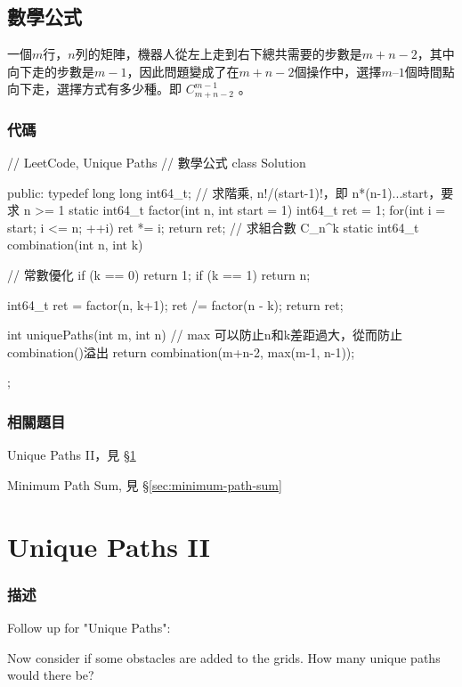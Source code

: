 \subsection{數學公式}
一個$m$行，$n$列的矩陣，機器人從左上走到右下總共需要的步數是$m+n-2$，其中向下走的步數是$m-1$，因此問題變成了在$m+n-2$個操作中，選擇$m–1$個時間點向下走，選擇方式有多少種。即 $C_{m+n-2}^{m-1}$ 。

\subsubsection{代碼}
\begin{Code}
// LeetCode, Unique Paths
// 數學公式
class Solution {
public:
    typedef long long int64_t;
    // 求階乘, n!/(start-1)!，即 n*(n-1)...start，要求 n >= 1
    static int64_t factor(int n, int start = 1) {
        int64_t  ret = 1;
        for(int i = start; i <= n; ++i)
            ret *= i;
        return ret;
    }
    // 求組合數 C_n^k
    static int64_t combination(int n, int k) {
        // 常數優化
        if (k == 0) return 1;
        if (k == 1) return n;

        int64_t ret = factor(n, k+1);
        ret /= factor(n - k);
        return ret;
    }

    int uniquePaths(int m, int n) {
        // max 可以防止n和k差距過大，從而防止combination()溢出
        return combination(m+n-2, max(m-1, n-1));
    }
};
\end{Code}


\subsubsection{相關題目}
\begindot
\item Unique Paths II，見 \S \ref{sec:unique-paths-ii}
\item Minimum Path Sum, 見 \S \ref{sec:minimum-path-sum}
\myenddot


\section{Unique Paths II} %
\label{sec:unique-paths-ii}


\subsubsection{描述}
Follow up for "Unique Paths":

Now consider if some obstacles are added to the grids. How many unique paths would there be?

